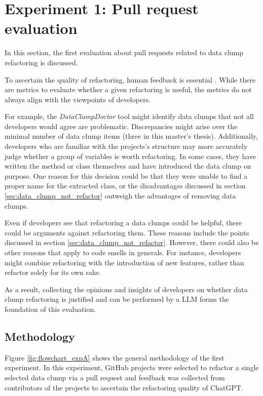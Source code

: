 
\section{Experiment 1: Pull request evaluation}\label{sec:pull_request_eval}
In this section, the first evaluation about pull requests  related to data clump refactoring is discussed. 

To ascertain the quality of refactoring, human feedback is essential \cite{search_based_refactoring}. While there are metrics to evaluate whether a given refactoring is useful, the metrics do not always align with the viewpoints of developers. 

 For example, the \textit{DataClumpDoctor} tool might identify data clumps that not all developers would agree are problematic. Discrepancies might arise over the minimal number of data clump items (three in this master's thesis). Additionally, developers who are  familiar with the projects's structure may more accurately judge  whether a group of variables  is worth refactoring. In some cases, they have written the method or class themselves and have introduced the data clump on purpose. One reason for this decision could be that they were unable to find a proper name for the extracted class, or the disadvantages discussed in section \ref{sec:data_clump_not_refactor} outweigh the advantages of removing data clumps.

Even if developers see that refactoring a data clumps could be helpful, there could be arguments against refactoring them. These reasons include the points  discussed in section \ref{sec:data_clump_not_refactor}. However, there could also be other reasons that apply to code smells in generals. For instance, developers might combine refactoring with the introduction of new features, rather than refactor solely for its own sake. 

As a result, collecting  the opinions and insights of developers on whether data clump refactoring is justified and can be performed by a \ac{LLM}  forms the foundation of this evaluation.





\subsection{Methodology}

Figure \ref{fig:flowchart_expA} shows the general methodology of the first experiment. 
In this experiment, GitHub projects were selected to refactor a single selected data clump via a pull request and feedback was collected from contributors of the projects to ascertain the refactoring quality of ChatGPT. 


